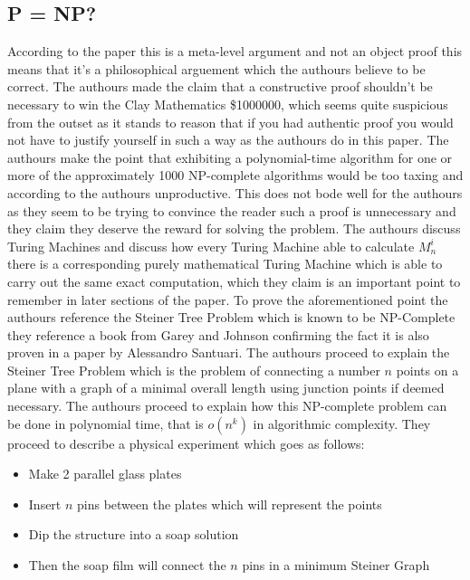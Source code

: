 \documentclass{report}
\begin{document}
\subsection{P = NP?}
According to the paper this is a meta-level argument and not an object proof\cite{PVsNPSolved} this means that it's a philosophical arguement which the authours believe to be correct.  The authours made the claim that a constructive proof shouldn't be necessary to win the Clay Mathematics \$1000000\cite{Millennium}, which seems quite suspicious from the outset as it stands to reason that if you had authentic proof you would not have to justify yourself in such a way as the authours do in this paper\cite{PVsNPSolved}.  The authours make the point that exhibiting a polynomial-time algorithm for one or more of the approximately 1000 NP-complete algorithms would be too taxing and according to the authours unproductive\cite{PVsNPSolved}.  This does not bode well for the authours as they seem to be trying to convince the reader such a proof is unnecessary and they claim they deserve the reward for solving the problem\cite{PVsNPSolved}.  The authours discuss Turing Machines and discuss how every Turing Machine able to calculate $M^i_n$ there is a corresponding purely mathematical Turing Machine which is able to carry out the same exact computation, which they claim is an important point to remember in later sections of the paper.  To prove the aforementioned point the authours reference the Steiner Tree Problem which is known to be NP-Complete they reference a book from Garey and Johnson confirming the fact\cite{GaeryJohnson} it is also proven in a paper by Alessandro Santuari\cite{Steiner}.  The authours proceed to explain the Steiner Tree Problem which is the problem of connecting a number $n$ points on a plane with a graph of a minimal overall length using junction points if deemed necessary\cite{Steiner}.  The authours proceed to explain how this NP-complete problem can be done in polynomial time, that is $o(n^k)$ in algorithmic complexity.  They proceed to describe a physical experiment\cite{PVsNPSolved} which goes as follows:
\begin{itemize}
  \item Make 2 parallel glass plates
  \item Insert $n$ pins between the plates which will represent the points
  \item Dip the structure into a soap solution
  \item Then the soap film will connect the $n$ pins in a minimum Steiner Graph
\end{itemize}
\end{document}
